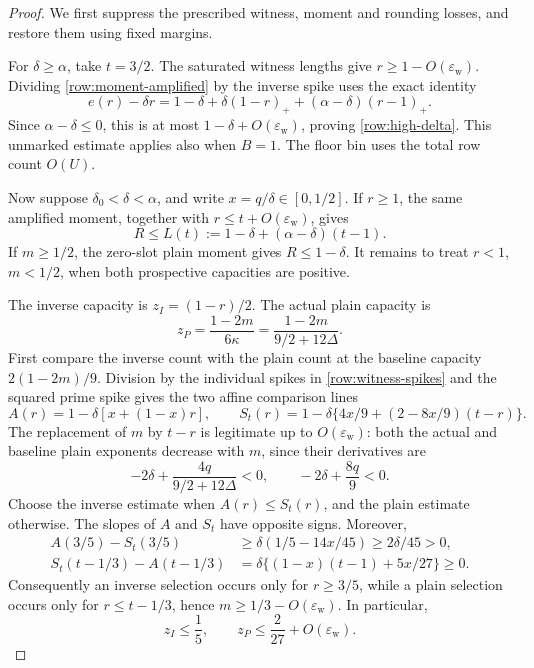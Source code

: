 \documentclass[11pt,a4paper]{article}
\numberwithin{equation}{section}
\theoremstyle{definition}
\theoremstyle{remark}
\newcommand{\eps}{\varepsilon}
\begin{document}
\begin{proof}
We first suppress the prescribed witness, moment and rounding losses,
and restore them using fixed margins.

For \(\delta\ge\alpha\), take \(t=3/2\).  The saturated witness lengths
give \(r\ge1-O(\eps_{\mathrm w})\).  Dividing
\eqref{row:moment-amplified} by the inverse spike uses the exact identity
\[
 e(r)-\delta r
 =1-\delta+\delta(1-r)_++(\alpha-\delta)(r-1)_+.
\]
Since \(\alpha-\delta\le0\), this is at most
\(1-\delta+O(\eps_{\mathrm w})\), proving
\eqref{row:high-delta}.  This unmarked estimate applies also when \(B=1\).
The floor bin uses the total row count \(O(U)\).

Now suppose \(\delta_0<\delta<\alpha\), and write
\(x=q/\delta\in[0,1/2]\).  If \(r\ge1\), the same amplified moment,
together with \(r\le t+O(\eps_{\mathrm w})\), gives
\begin{equation}\label{row:long-line}
 R\le L(t):=1-\delta+(\alpha-\delta)(t-1).
\end{equation}
If \(m\ge1/2\), the zero-slot plain moment gives \(R\le1-\delta\).
It remains to treat \(r<1\), \(m<1/2\), when both prospective
capacities are positive.

The inverse capacity is \(z_I=(1-r)/2\).  The actual plain capacity is
\begin{equation}\label{row:plain-capacity}
 z_P=\frac{1-2m}{6\kappa}
     =\frac{1-2m}{9/2+12\Delta}.
\end{equation}
First compare the inverse count with the plain count at the baseline
capacity \(2(1-2m)/9\).  Division by the individual spikes in
\eqref{row:witness-spikes} and the squared prime spike gives the two
affine comparison lines
\[
 A(r)=1-\delta[x+(1-x)r],\qquad
 S_t(r)=1-\delta\{4x/9+(2-8x/9)(t-r)\}.
\]
The replacement of \(m\) by \(t-r\) is legitimate up to
\(O(\eps_{\mathrm w})\): both the actual and baseline plain exponents
decrease with \(m\), since their derivatives are
\[
 -2\delta+\frac{4q}{9/2+12\Delta}<0,\qquad
 -2\delta+\frac{8q}{9}<0.
\]
Choose the inverse estimate when \(A(r)\le S_t(r)\), and the plain
estimate otherwise.  The slopes of \(A\) and \(S_t\) have opposite
signs.  Moreover,
\begin{align*}
 A(3/5)-S_t(3/5)
   &\ge\delta(1/5-14x/45)\ge2\delta/45>0,\\
 S_t(t-1/3)-A(t-1/3)
   &=\delta\{(1-x)(t-1)+5x/27\}\ge0.
\end{align*}
Consequently an inverse selection occurs only for \(r\ge3/5\), while
a plain selection occurs only for \(r\le t-1/3\), hence
\(m\ge1/3-O(\eps_{\mathrm w})\).  In particular,
\begin{equation}\label{row:capacity-bounds}
 z_I\le\frac15,\qquad z_P\le\frac2{27}+O(\eps_{\mathrm w}).
\end{equation}


\end{proof}
\end{document}
